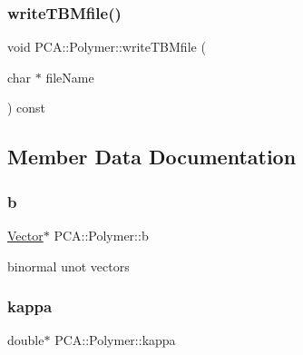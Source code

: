 \hypertarget{class_p_c_a_1_1_polymer_ac89188a3e56684ff3313a43ff83abea0}{}\label{class_p_c_a_1_1_polymer_ac89188a3e56684ff3313a43ff83abea0} 
\subsubsection{\texorpdfstring{write\+T\+B\+Mfile()}{writeTBMfile()}}
{\footnotesize\ttfamily void P\+C\+A\+::\+Polymer\+::write\+T\+B\+Mfile (\begin{DoxyParamCaption}\item[{char $\ast$}]{file\+Name }\end{DoxyParamCaption}) const}



\subsection{Member Data Documentation}
\hypertarget{class_p_c_a_1_1_polymer_ad93199b0187ab557476153b204b921c7}{}\label{class_p_c_a_1_1_polymer_ad93199b0187ab557476153b204b921c7} 
\subsubsection{\texorpdfstring{b}{b}}
{\footnotesize\ttfamily \hyperlink{class_p_c_a_1_1_vector}{Vector}$\ast$ P\+C\+A\+::\+Polymer\+::b\hspace{0.3cm}{\ttfamily [protected]}}



binormal unot vectors 

\hypertarget{class_p_c_a_1_1_polymer_a1bef29f1613bb4b67981aae7df3d804b}{}\label{class_p_c_a_1_1_polymer_a1bef29f1613bb4b67981aae7df3d804b} 
\subsubsection{\texorpdfstring{kappa}{kappa}}
{\footnotesize\ttfamily double$\ast$ P\+C\+A\+::\+Polymer\+::kappa\hspace{0.3cm}{\ttfamily [protected]}}



